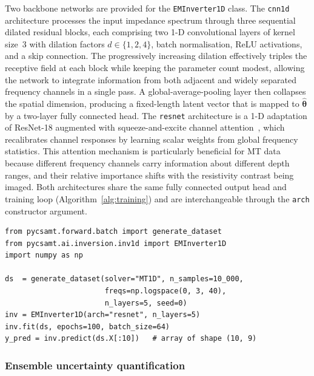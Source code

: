 \documentclass[review,12pt]{elsarticle}
\begin{document}
Two backbone networks are provided for the \texttt{EMInverter1D} class.
The \texttt{cnn1d} architecture processes the input impedance spectrum
through three sequential dilated residual blocks, each comprising two
1-D convolutional layers of kernel size~3 with dilation factors $d\in\{1,2,4\}$,
batch normalisation, ReLU activations, and a skip connection.
The progressively increasing dilation effectively triples the receptive
field at each block while keeping the parameter count modest, allowing the
network to integrate information from both adjacent and widely separated
frequency channels in a single pass.
A global-average-pooling layer then collapses the spatial dimension,
producing a fixed-length latent vector that is mapped to $\hat{\boldsymbol\theta}$
by a two-layer fully connected head.
The \texttt{resnet} architecture is a 1-D adaptation of ResNet-18 augmented
with squeeze-and-excite channel attention~\citep{Puzyrev2021}, which
recalibrates channel responses by learning scalar weights from global
frequency statistics.
This attention mechanism is particularly beneficial for MT data because
different frequency channels carry information about different depth ranges,
and their relative importance shifts with the resistivity contrast being
imaged.
Both architectures share the same fully connected output head and training
loop (Algorithm~\ref{alg:training}) and are interchangeable through the
\texttt{arch} constructor argument.

\begin{lstlisting}[style=pycode, caption={Training \texttt{EMInverter1D} and applying it to field data.}]
from pycsamt.forward.batch import generate_dataset
from pycsamt.ai.inversion.inv1d import EMInverter1D
import numpy as np

ds  = generate_dataset(solver="MT1D", n_samples=10_000,
                       freqs=np.logspace(0, 3, 40),
                       n_layers=5, seed=0)
inv = EMInverter1D(arch="resnet", n_layers=5)
inv.fit(ds, epochs=100, batch_size=64)
y_pred = inv.predict(ds.X[:10])   # array of shape (10, 9)
\end{lstlisting}

\subsubsection{Ensemble uncertainty quantification}
\end{document}
